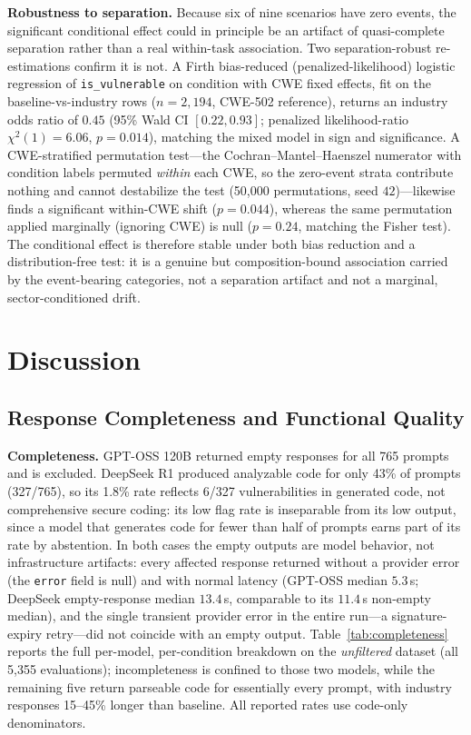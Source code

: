\documentclass[sigconf,review,anonymous]{acmart}
\begin{document}
\textbf{Robustness to separation.} Because six of nine scenarios have zero events, the significant conditional effect could in principle be an artifact of quasi-complete separation rather than a real within-task association. Two separation-robust re-estimations confirm it is not. A Firth bias-reduced (penalized-likelihood) logistic regression of \texttt{is\_vulnerable} on condition with CWE fixed effects, fit on the baseline-vs-industry rows ($n=2{,}194$, CWE-502 reference), returns an industry odds ratio of $0.45$ (95\% Wald CI $[0.22, 0.93]$; penalized likelihood-ratio $\chi^2(1)=6.06$, $p=0.014$), matching the mixed model in sign and significance. A CWE-stratified permutation test---the Cochran--Mantel--Haenszel numerator with condition labels permuted \emph{within} each CWE, so the zero-event strata contribute nothing and cannot destabilize the test (50{,}000 permutations, seed $42$)---likewise finds a significant within-CWE shift ($p=0.044$), whereas the same permutation applied marginally (ignoring CWE) is null ($p=0.24$, matching the Fisher test). The conditional effect is therefore stable under both bias reduction and a distribution-free test: it is a genuine but composition-bound association carried by the event-bearing categories, not a separation artifact and not a marginal, sector-conditioned drift.

\section{Discussion}

\subsection{Response Completeness and Functional Quality}

\textbf{Completeness.} GPT-OSS 120B returned empty responses for all 765 prompts and is excluded. DeepSeek R1 produced analyzable code for only 43\% of prompts (327/765), so its 1.8\% rate reflects 6/327 vulnerabilities in generated code, not comprehensive secure coding: its low flag rate is inseparable from its low output, since a model that generates code for fewer than half of prompts earns part of its rate by abstention. In both cases the empty outputs are model behavior, not infrastructure artifacts: every affected response returned without a provider error (the \texttt{error} field is null) and with normal latency (GPT-OSS median $5.3$\,s; DeepSeek empty-response median $13.4$\,s, comparable to its $11.4$\,s non-empty median), and the single transient provider error in the entire run---a signature-expiry retry---did not coincide with an empty output. Table~\ref{tab:completeness} reports the full per-model, per-condition breakdown on the \emph{unfiltered} dataset (all 5,355 evaluations); incompleteness is confined to those two models, while the remaining five return parseable code for essentially every prompt, with industry responses 15--45\% longer than baseline. All reported rates use code-only denominators.
\end{document}
